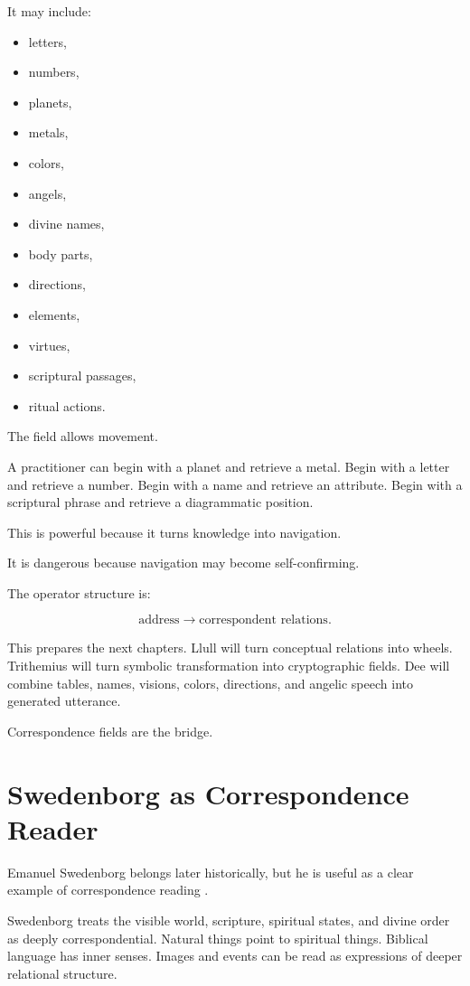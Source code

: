 \documentclass[11pt]{book}
\begin{document}
It may include:

\begin{itemize}
    \item letters,
    \item numbers,
    \item planets,
    \item metals,
    \item colors,
    \item angels,
    \item divine names,
    \item body parts,
    \item directions,
    \item elements,
    \item virtues,
    \item scriptural passages,
    \item ritual actions.
\end{itemize}

The field allows movement.

A practitioner can begin with a planet and retrieve a metal. Begin with a letter and retrieve a number. Begin with a name and retrieve an attribute. Begin with a scriptural phrase and retrieve a diagrammatic position.

This is powerful because it turns knowledge into navigation.

It is dangerous because navigation may become self-confirming.

The operator structure is:

\[
\text{address} \rightarrow \text{correspondent relations}.
\]

This prepares the next chapters. Llull will turn conceptual relations into wheels. Trithemius will turn symbolic transformation into cryptographic fields. Dee will combine tables, names, visions, colors, directions, and angelic speech into generated utterance.

Correspondence fields are the bridge.

\section{Swedenborg as Correspondence Reader}

Emanuel Swedenborg belongs later historically, but he is useful as a clear example of correspondence reading \cite{SwedenborgHeavenHell,Swedenborg1749Arcana}.

Swedenborg treats the visible world, scripture, spiritual states, and divine order as deeply correspondential. Natural things point to spiritual things. Biblical language has inner senses. Images and events can be read as expressions of deeper relational structure.
\end{document}
